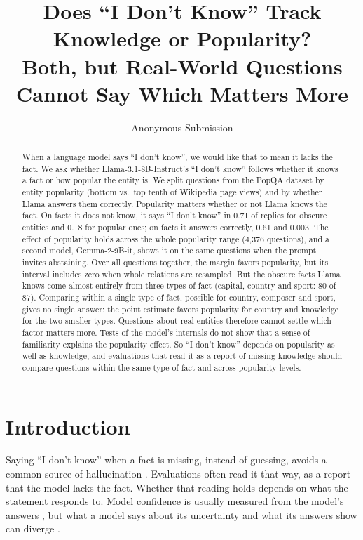 \documentclass[letterpaper]{article} %
\title{Does ``I Don't Know'' Track Knowledge or Popularity?\\Both, but Real-World Questions Cannot Say Which Matters More}
\author{
    Anonymous Submission
}
\newcommand{\idk}{``I don't know''}
\begin{document}
\maketitle

\begin{abstract}
When a language model says \idk, we would like that to mean it lacks the fact. We ask whether Llama-3.1-8B-Instruct's \idk{} follows whether it knows a fact or how popular the entity is. We split questions from the PopQA dataset by entity popularity (bottom vs.\ top tenth of Wikipedia page views) and by whether Llama answers them correctly. Popularity matters whether or not Llama knows the fact. On facts it does not know, it says \idk{} in 0.71 of replies for obscure entities and 0.18 for popular ones; on facts it answers correctly, 0.61 and 0.003. The effect of popularity holds across the whole popularity range (4,376 questions), and a second model, Gemma-2-9B-it, shows it on the same questions when the prompt invites abstaining. Over all questions together, the margin favors popularity, but its interval includes zero when whole relations are resampled. But the obscure facts Llama knows come almost entirely from three types of fact (capital, country and sport: 80 of 87). Comparing within a single type of fact, possible for country, composer and sport, gives no single answer: the point estimate favors popularity for country and knowledge for the two smaller types. Questions about real entities therefore cannot settle which factor matters more. Tests of the model's internals do not show that a sense of familiarity explains the popularity effect. So \idk{} depends on popularity as well as knowledge, and evaluations that read it as a report of missing knowledge should compare questions within the same type of fact and across popularity levels.
\end{abstract}

\section{Introduction}

Saying \idk{} when a fact is missing, instead of guessing, avoids a common source of hallucination \citep{kalai2025hallucinate}. Evaluations often read it that way, as a report that the model lacks the fact. Whether that reading holds depends on what the statement responds to. Model confidence is usually measured from the model's answers \citep{kadavath2022know,kuhn2023semantic}, but what a model says about its uncertainty and what its answers show can diverge \citep{ji2025calibrating}.
\end{document}
